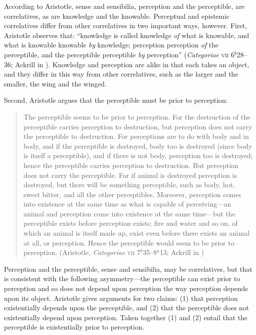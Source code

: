 According to Aristotle, sense and sensibilia, perception and the perceptible, are correlatives, as are knowledge and the knowable. Perceptual and epistemic correlatives differ from other correlatives in two important ways, however. First, Aristotle observes that: ``knowledge is called knowledge \emph{of} what is knowable, and what is knowable knowable \emph{by} knowledge; perception perception \emph{of} the perceptible, and the perceptible perceptible \emph{by} perception'' (\emph{Categoriae} \textsc{vii} 6\( ^{b} \)28--36; Ackrill in \citealt[11--12]{Barnes:1984uq}). Knowledge and perception are alike in that each takes an object, and they differ in this way from other correlatives, such as the larger and the smaller, the wing and the winged. 

Second, Aristotle argues that the perceptible must be prior to perception:
\begin{quote}
    The perceptible seems to be prior to perception. For the destruction of the perceptible carries perception to destruction, but perception does not carry the perceptible to destruction. For perceptions are to do with body and in body, and if the perceptible is destroyed, body too is destroyed (since body is itself a perceptible), and if there is not body, perception too is destroyed; hence the perceptible carries perception to destruction. But perception does not carry the perceptible. For if animal is destroyed perception is destroyed, but there will be something perceptible, such as body, hot, sweet bitter, and all the other perceptibles. Moreover, perception comes into existence at the same time as what is capable of perceiving---an animal and perception come into existence at the same time---but the perceptible exists before perception exists; fire and water and so on, of which an animal is itself made up, exist even before there exists an animal at all, or perception. Hence the perceptible would seem to be prior to perception. (Aristotle, \emph{Categoriae} \textsc{vii} 7\( ^{b} \)35--8\( ^{a} \)13; Ackrill in \citealt[13--14]{Barnes:1984uq})
\end{quote}
Perception and the perceptible, sense and sensibilia, may be correlatives, but that is consistent with the following asymmetry---the perceptible can exist prior to perception and so does not depend upon perception the way perception depends upon its object. Aristotle gives arguments for two claims: (1) that perception existentially depends upon the perceptible, and (2) that the perceptible does not existentially depend upon perception. Taken together (1) and (2) entail that the perceptible is existentially prior to perception.


